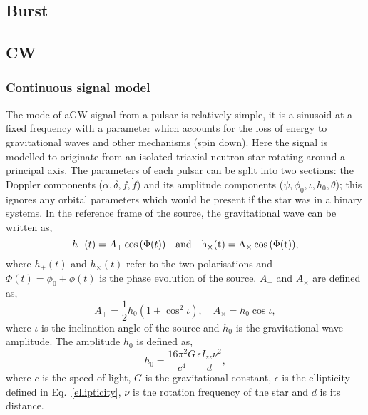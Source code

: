 \subsection{Burst}

\subsection{CW}

\subsubsection{Continuous signal model}

The mode of a\ac{GW} signal from a pulsar is relatively simple, it is a sinusoid at a fixed frequency with a parameter which accounts for the loss of energy to gravitational waves and other mechanisms (spin down). 
Here the signal is modelled to originate from an isolated triaxial neutron star rotating around a principal axis. 
The parameters of each pulsar can be split into two sections: the Doppler components ($\alpha,\delta,f,\dot{f}$) and its amplitude components ($\psi,\phi_0, \iota, h_0, \theta$); this ignores any orbital parameters which would be present if the star was in a binary systems.
In the reference frame of the source, the gravitational wave can be written as,
\begin{equation}
h_{+}(t) = A_{+}\cos{(\Phi(t))} \quad \rm{and} \quad h_{\times}(t) = A_{\times}\cos{(\Phi(t))},
\end{equation}
where $h_{+}(t)$ and $h_{\times}(t)$ refer to the two polarisations and $\Phi(t) = \phi_0 + \phi(t)$ is the phase evolution of the source. $A_+$ and $A_{\times}$ are defined as,
\begin{equation}
A_+ = \frac{1}{2}h_0(1+\cos^2{\iota}), \quad A_{\times} = h_0 \cos{\iota},
\end{equation}
where $\iota$ is the inclination angle of the source and $h_0$ is the gravitational wave amplitude. The amplitude $h_0$ is defined as,
\begin{equation}
h_0 = \frac{16\pi^2 G}{c^4} \frac{\epsilon I_{zz} \nu^2}{d},
\end{equation}
where $c$ is the speed of light, $G$ is the gravitational constant, $\epsilon $ is the ellipticity defined in Eq.~\ref{ellipticity}, $\nu$ is the rotation frequency of the star and $d$ is its distance. 

